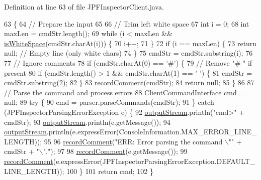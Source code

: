 Definition at line 63 of file J\+P\+F\+Inspector\+Client.\+java.


\begin{DoxyCode}
63                                                                                             \{
64     \textcolor{comment}{// Prepare the input}
65 
66     \textcolor{comment}{// Trim left white space}
67     \textcolor{keywordtype}{int} i = 0;
68     \textcolor{keywordtype}{int} maxLen = cmdStr.length();
69     \textcolor{keywordflow}{while} (i < maxLen && \hyperlink{classgov_1_1nasa_1_1jpf_1_1inspector_1_1client_1_1_j_p_f_inspector_client_a9fad20c60114342e5cc098e662f51ed7}{isWhiteSpace}(cmdStr.charAt(i))) \{
70       i++;
71     \}
72     \textcolor{keywordflow}{if} (i == maxLen) \{
73       \textcolor{keywordflow}{return} null; \textcolor{comment}{// Empty line (only white chars)}
74     \}
75     cmdStr = cmdStr.substring(i);
76 
77     \textcolor{comment}{// Ignore comments}
78     \textcolor{keywordflow}{if} (cmdStr.charAt(0) == \textcolor{charliteral}{'#'}) \{
79       \textcolor{comment}{// Remove "# " if present}
80       \textcolor{keywordflow}{if} (cmdStr.length() > 1 && cmdStr.charAt(1) == \textcolor{charliteral}{' '}) \{
81         cmdStr = cmdStr.substring(2);
82       \}
83       \hyperlink{classgov_1_1nasa_1_1jpf_1_1inspector_1_1client_1_1_j_p_f_inspector_client_af171559f38358893908a09ef76ff800f}{recordComment}(cmdStr);
84       \textcolor{keywordflow}{return} null;
85     \}
86 
87     \textcolor{comment}{// Parse the command and process errors}
88     ClientCommandInterface cmd = null;
89     \textcolor{keywordflow}{try} \{
90       cmd = parser.parseCommands(cmdStr);
91     \} \textcolor{keywordflow}{catch} (JPFInspectorParsingErrorException e) \{
92       \hyperlink{classgov_1_1nasa_1_1jpf_1_1inspector_1_1client_1_1_j_p_f_inspector_client_ad5e02cdfa86797b3d16ab288e041b349}{outputStream}.println(\textcolor{stringliteral}{"cmd>"} + cmdStr);
93       \hyperlink{classgov_1_1nasa_1_1jpf_1_1inspector_1_1client_1_1_j_p_f_inspector_client_ad5e02cdfa86797b3d16ab288e041b349}{outputStream}.println(e.getMessage());
94       \hyperlink{classgov_1_1nasa_1_1jpf_1_1inspector_1_1client_1_1_j_p_f_inspector_client_ad5e02cdfa86797b3d16ab288e041b349}{outputStream}.println(e.expressError(ConsoleInformation.MAX\_ERROR\_LINE\_LENGTH));
95 
96       \hyperlink{classgov_1_1nasa_1_1jpf_1_1inspector_1_1client_1_1_j_p_f_inspector_client_af171559f38358893908a09ef76ff800f}{recordComment}(\textcolor{stringliteral}{"ERR:  Error parsing the command \(\backslash\)""} + cmdStr + \textcolor{stringliteral}{"\(\backslash\)"."});
97 
98       \hyperlink{classgov_1_1nasa_1_1jpf_1_1inspector_1_1client_1_1_j_p_f_inspector_client_af171559f38358893908a09ef76ff800f}{recordComment}(e.getMessage());
99       \hyperlink{classgov_1_1nasa_1_1jpf_1_1inspector_1_1client_1_1_j_p_f_inspector_client_af171559f38358893908a09ef76ff800f}{recordComment}(e.expressError(JPFInspectorParsingErrorException.DEFAULT\_LINE\_LENGTH));
100     \}
101     \textcolor{keywordflow}{return} cmd;
102   \}
\end{DoxyCode}
